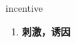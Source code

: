 
\begin{frame}
{\huge incentive}
\begin{center}
\begin{enumerate}\Large
  \item \textbf{刺激，诱因}
\end{enumerate}
\end{center}
\end{frame}
